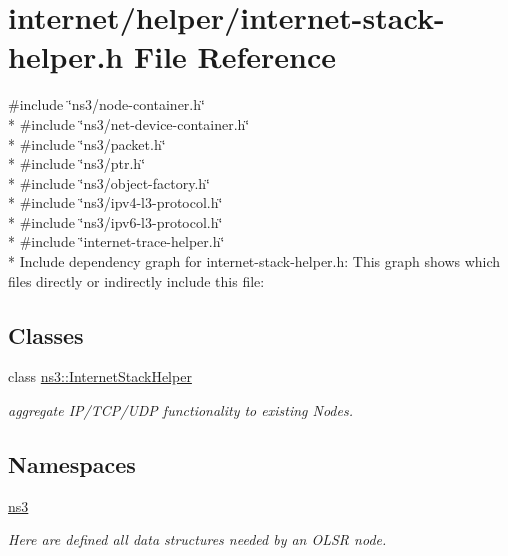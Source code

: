 \hypertarget{internet-stack-helper_8h}{}\section{internet/helper/internet-\/stack-\/helper.h File Reference}
\label{internet-stack-helper_8h}
{\ttfamily \#include \char`\"{}ns3/node-\/container.\+h\char`\"{}}\\*
{\ttfamily \#include \char`\"{}ns3/net-\/device-\/container.\+h\char`\"{}}\\*
{\ttfamily \#include \char`\"{}ns3/packet.\+h\char`\"{}}\\*
{\ttfamily \#include \char`\"{}ns3/ptr.\+h\char`\"{}}\\*
{\ttfamily \#include \char`\"{}ns3/object-\/factory.\+h\char`\"{}}\\*
{\ttfamily \#include \char`\"{}ns3/ipv4-\/l3-\/protocol.\+h\char`\"{}}\\*
{\ttfamily \#include \char`\"{}ns3/ipv6-\/l3-\/protocol.\+h\char`\"{}}\\*
{\ttfamily \#include \char`\"{}internet-\/trace-\/helper.\+h\char`\"{}}\\*
Include dependency graph for internet-\/stack-\/helper.h\+:
This graph shows which files directly or indirectly include this file\+:
\subsection*{Classes}
\begin{DoxyCompactItemize}
\item 
class \hyperlink{classns3_1_1InternetStackHelper}{ns3\+::\+Internet\+Stack\+Helper}
\begin{DoxyCompactList}\small\item\em aggregate I\+P/\+T\+C\+P/\+U\+DP functionality to existing Nodes. \end{DoxyCompactList}\end{DoxyCompactItemize}
\subsection*{Namespaces}
\begin{DoxyCompactItemize}
\item 
 \hyperlink{namespacens3}{ns3}
\begin{DoxyCompactList}\small\item\em Here are defined all data structures needed by an O\+L\+SR node. \end{DoxyCompactList}\end{DoxyCompactItemize}
